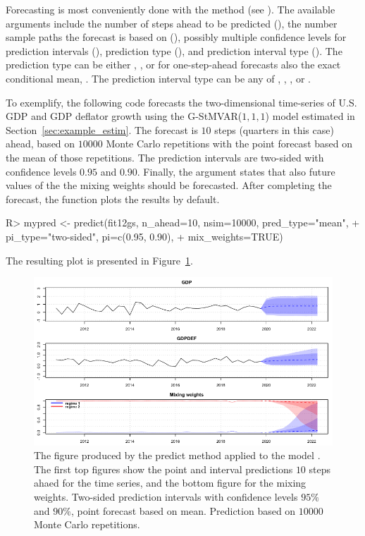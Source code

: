 \documentclass[nojss]{jss}
\begin{document}
Forecasting is most conveniently done with the  method (see ). The available arguments include the number of steps ahead to be predicted (), the number sample paths the forecast is based on (), possibly multiple confidence levels for prediction intervals (), prediction type (), and prediction interval type (). The prediction type can be either , , or for one-step-ahead forecasts also the exact conditional mean, . The prediction interval type can be any of , , , or .

To exemplify, the following code forecasts the two-dimensional time-series of U.S. GDP and GDP deflator growth using the G-StMVAR($1, 1, 1$) model  estimated in Section~\ref{sec:example_estim}. The forecast is $10$ steps (quarters in this case) ahead, based on $10000$ Monte Carlo repetitions with the point forecast based on the mean of those repetitions. The prediction intervals are two-sided with confidence levels $0.95$ and $0.90$. Finally, the argument  states that also future values of the the mixing weights should be forecasted. After completing the forecast, the function plots the results by default.
%
\begin{CodeChunk}
\begin{CodeInput}
R> mypred <- predict(fit12gs, n_ahead=10, nsim=10000, pred_type="mean",
+                    pi_type="two-sided", pi=c(0.95, 0.90),
+                    mix_weights=TRUE)
\end{CodeInput}
\end{CodeChunk}
%
The resulting plot is presented in Figure~\ref{fig:predplot}.


\begin{figure}%
  \centering
  \includegraphics{figures/predplot.png}
  \caption{The figure produced by the predict method applied to the model . The first top figures show the point and interval predictions $10$ steps ahaed for the time series, and the bottom figure for the mixing weights. Two-sided prediction intervals with confidence levels $95\%$ and $90\%$, point forecast based on mean. Prediction based on $10000$ Monte Carlo repetitions.}
\label{fig:predplot}
\end{figure}
\end{document}
